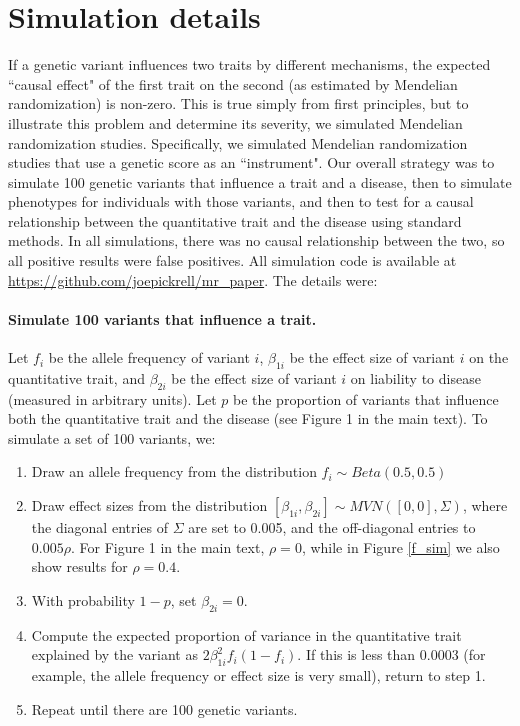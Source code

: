 \documentclass[11pt,titlepage]{article}
\begin{document}
\section{Simulation details}
If a genetic variant influences two traits by different mechanisms, the expected ``causal effect" of the first trait on the second (as estimated by Mendelian randomization) is non-zero. This is true simply from first principles, but to illustrate this problem and determine its severity, we simulated Mendelian randomization studies. Specifically, we simulated Mendelian randomization studies that use a genetic score as an ``instrument". Our overall strategy was to simulate 100 genetic variants that influence a trait and a disease, then to simulate phenotypes for individuals with those variants, and then to test for a causal relationship between the quantitative trait and the disease using standard methods. In all simulations, there was no causal relationship between the two, so all positive results were false positives. All simulation code is available at \url{https://github.com/joepickrell/mr_paper}. The details were:

\paragraph{Simulate 100 variants that influence a trait.}
Let $f_i$ be the allele frequency of variant $i$, $\beta_{1i}$ be the effect size of variant $i$ on the quantitative trait, and $\beta_{2i}$ be the effect size of variant $i$ on liability to disease (measured in arbitrary units). Let $p$ be the proportion of variants that influence both the quantitative trait and the disease (see Figure 1 in the main text). To simulate a set of 100 variants, we:
\begin{enumerate}
\item Draw an allele frequency from the distribution $f_i \sim Beta(0.5, 0.5)$ 
\item Draw effect sizes from the distribution $[\beta_{1i}, \beta_{2i}] \sim MVN ( [0,0], \Sigma)$, where the diagonal entries of $\Sigma$ are set to 0.005, and the off-diagonal entries to $0.005 \rho$. For Figure 1 in the main text, $\rho = 0$, while in Figure \ref{f_sim} we also show results for $\rho = 0.4$. 
\item With probability $1-p$, set $\beta_{2i} = 0$.
\item Compute the expected proportion of variance in the quantitative trait explained by the variant as $2\beta_{1i}^2 f_i (1-f_i)$. If this is less than 0.0003 (for example, the allele frequency or effect size is very small), return to step 1.
\item Repeat until there are 100 genetic variants. 
\end{enumerate}
\end{document}

